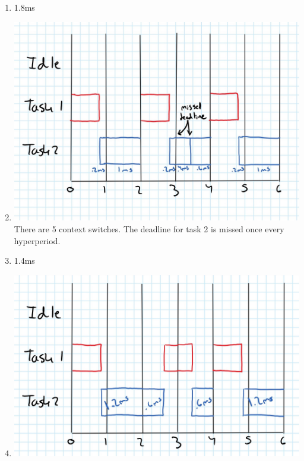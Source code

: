 \documentclass{jhwhw}
\begin{document}
\problem{}
\begin{enumerate}
\item 1.8ms
\item \includegraphics[scale=0.50]{HW3-2.jpg} \\
There are 5 context switches. The deadline for task 2 is missed once every hyperperiod.
\item 1.4ms
\item \includegraphics[scale=0.50]{HW3-3.jpg} \\
\end{enumerate}
\end{document}
